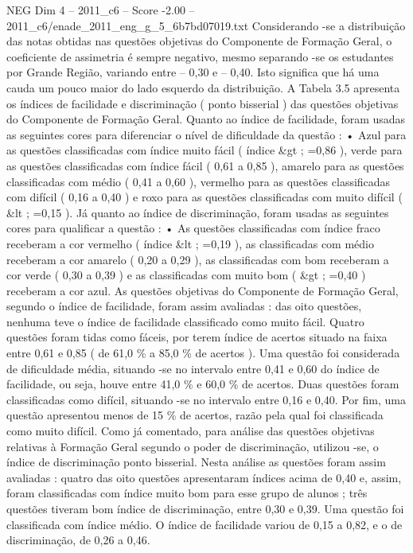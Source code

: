 \begin{textsample}{NEG Dim 4 – 2011\_c6 – Score -2.00 – 2011\_c6/enade\_2011\_eng\_g\_5\_6b7bd07019.txt}
Considerando -se a distribuição das notas obtidas nas questões objetivas do Componente de Formação Geral, o coeficiente de assimetria é sempre negativo, mesmo separando -se os estudantes por Grande Região, variando entre – 0,30 e – 0,40.
Isto significa que há uma cauda um pouco maior do lado esquerdo da distribuição.
A Tabela 3.5 apresenta os índices de facilidade e discriminação ( ponto bisserial ) das questões objetivas do Componente de Formação Geral.
Quanto ao índice de facilidade, foram usadas as seguintes cores para diferenciar o nível de dificuldade da questão : • Azul para as questões classificadas com índice muito fácil ( índice \&gt ; =0,86 ), verde para as questões classificadas com índice fácil ( 0,61 a 0,85 ), amarelo para as questões classificadas com médio ( 0,41 a 0,60 ), vermelho para as questões classificadas com difícil ( 0,16 a 0,40 ) e roxo para as questões classificadas com muito difícil ( \&lt ; =0,15 ).
Já quanto ao índice de discriminação, foram usadas as seguintes cores para qualificar a questão : • As questões classificadas com índice fraco receberam a cor vermelho ( índice \&lt ; =0,19 ), as classificadas com médio receberam a cor amarelo ( 0,20 a 0,29 ), as classificadas com bom receberam a cor verde ( 0,30 a 0,39 ) e as classificadas com muito bom ( \&gt ; =0,40 ) receberam a cor azul.
As questões objetivas do Componente de Formação Geral, segundo o índice de facilidade, foram assim avaliadas : das oito questões, nenhuma teve o índice de facilidade classificado como muito fácil.
Quatro questões foram tidas como fáceis, por terem índice de acertos situado na faixa entre 0,61 e 0,85 ( de 61,0 \% a 85,0 \% de acertos ).
Uma questão foi considerada de dificuldade média, situando -se no intervalo entre 0,41 e 0,60 do índice de facilidade, ou seja, houve entre 41,0 \% e 60,0 \% de acertos.
Duas questões foram classificadas como difícil, situando -se no intervalo entre 0,16 e 0,40.
Por fim, uma questão apresentou menos de 15 \% de acertos, razão pela qual foi classificada como muito difícil.
Como já comentado, para análise das questões objetivas relativas à Formação Geral segundo o poder de discriminação, utilizou -se, o índice de discriminação ponto bisserial.
Nesta análise as questões foram assim avaliadas : quatro das oito questões apresentaram índices acima de 0,40 e, assim, foram classificadas com índice muito bom para esse grupo de alunos ; três questões tiveram bom índice de discriminação, entre 0,30 e 0,39.
Uma questão foi classificada com índice médio.
O índice de facilidade variou de 0,15 a 0,82, e o de discriminação, de 0,26 a 0,46.

\end{textsample}
